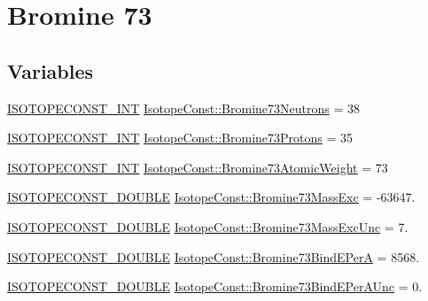 \hypertarget{group___isotope_const-_bromine-_br73}{}\section{Bromine 73}
\label{group___isotope_const-_bromine-_br73}
\subsection*{Variables}
\begin{DoxyCompactItemize}
\item 
\mbox{\hyperlink{group___isotope_const-_macros_ga5f18360b3e99483a35c32d789e62621c}{I\+S\+O\+T\+O\+P\+E\+C\+O\+N\+S\+T\+\_\+\+I\+NT}} \mbox{\hyperlink{group___isotope_const-_bromine-_br73_ga83fb2049ddbaa2ef8cdc2f3f5f743333}{Isotope\+Const\+::\+Bromine73\+Neutrons}} = 38
\item 
\mbox{\hyperlink{group___isotope_const-_macros_ga5f18360b3e99483a35c32d789e62621c}{I\+S\+O\+T\+O\+P\+E\+C\+O\+N\+S\+T\+\_\+\+I\+NT}} \mbox{\hyperlink{group___isotope_const-_bromine-_br73_ga221e17c32b396b6ed7f94407f33859a8}{Isotope\+Const\+::\+Bromine73\+Protons}} = 35
\item 
\mbox{\hyperlink{group___isotope_const-_macros_ga5f18360b3e99483a35c32d789e62621c}{I\+S\+O\+T\+O\+P\+E\+C\+O\+N\+S\+T\+\_\+\+I\+NT}} \mbox{\hyperlink{group___isotope_const-_bromine-_br73_gaba5dfee0c044ceb527db9894838771bd}{Isotope\+Const\+::\+Bromine73\+Atomic\+Weight}} = 73
\item 
\mbox{\hyperlink{group___isotope_const-_macros_ga8f45a7272ce02c0b4c65c44636ed719a}{I\+S\+O\+T\+O\+P\+E\+C\+O\+N\+S\+T\+\_\+\+D\+O\+U\+B\+LE}} \mbox{\hyperlink{group___isotope_const-_bromine-_br73_ga9ad84226f97358899a7272d8ec64d3b9}{Isotope\+Const\+::\+Bromine73\+Mass\+Exc}} = -\/63647.
\item 
\mbox{\hyperlink{group___isotope_const-_macros_ga8f45a7272ce02c0b4c65c44636ed719a}{I\+S\+O\+T\+O\+P\+E\+C\+O\+N\+S\+T\+\_\+\+D\+O\+U\+B\+LE}} \mbox{\hyperlink{group___isotope_const-_bromine-_br73_gae1de26124293aa540759ae38f876e3ca}{Isotope\+Const\+::\+Bromine73\+Mass\+Exc\+Unc}} = 7.
\item 
\mbox{\hyperlink{group___isotope_const-_macros_ga8f45a7272ce02c0b4c65c44636ed719a}{I\+S\+O\+T\+O\+P\+E\+C\+O\+N\+S\+T\+\_\+\+D\+O\+U\+B\+LE}} \mbox{\hyperlink{group___isotope_const-_bromine-_br73_ga16be844cbd09561a8e124a71dd666f0e}{Isotope\+Const\+::\+Bromine73\+Bind\+E\+PerA}} = 8568.
\item 
\mbox{\hyperlink{group___isotope_const-_macros_ga8f45a7272ce02c0b4c65c44636ed719a}{I\+S\+O\+T\+O\+P\+E\+C\+O\+N\+S\+T\+\_\+\+D\+O\+U\+B\+LE}} \mbox{\hyperlink{group___isotope_const-_bromine-_br73_ga1db11dd35479f5e58805e80059367f75}{Isotope\+Const\+::\+Bromine73\+Bind\+E\+Per\+A\+Unc}} = 0.

\end{DoxyCompactItemize}
